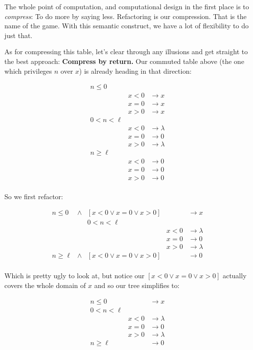 \documentclass[twoside]{article}
\begin{document}
The whole point of computation, and computational design in the first place is to \emph{compress}:
To do more by saying less. Refactoring is our compression. That is the name of the game.
With this semantic construct, we have a lot of flexibility to do just that.

As for compressing this table, let's clear through any illusions and get straight to the best approach:
{\bfseries Compress by return.} Our commuted table above (the one which privileges $ n $ over $ x $)
is already heading in that direction:

$$ \begin{array}{r|lr}
n \le 0		& \\
		& x < 0		& \to x		\\
		& x = 0		& \to x		\\
		& x > 0		& \to x		\\
0 < n < \ell	& \\
		& x < 0		& \to \lambda	\\
		& x = 0		& \to 0		\\
		& x > 0		& \to \lambda	\\
n \ge \ell	& \\
		& x < 0		& \to 0		\\
		& x = 0		& \to 0		\\
		& x > 0		& \to 0		\\
\end{array} $$

So we first refactor:

$$ \begin{array}{rcr|ll}
n \le 0		& \wedge	& [ x < 0 \vee x = 0 \vee x > 0]	&		& \to x		\\
		&		& 0 < n < \ell				& \\
		&		&					& x < 0		& \to \lambda	\\
		&		&					& x = 0		& \to 0		\\
		&		&					& x > 0		& \to \lambda	\\
n \ge \ell	& \wedge	& [ x < 0 \vee x = 0 \vee x > 0]	&		& \to 0		\\
\end{array} $$

Which is pretty ugly to look at, but notice our $ [ x < 0 \vee x = 0 \vee x > 0] $
actually covers the whole domain of $ x $ and so our tree simplifies to:

$$ \begin{array}{r|ll}
n \le 0		&		& \to x		\\
0 < n < \ell	& \\
		& x < 0		& \to \lambda	\\
		& x = 0		& \to 0		\\
		& x > 0		& \to \lambda	\\
n \ge \ell	& 		& \to 0		\\
\end{array} $$
\end{document}
